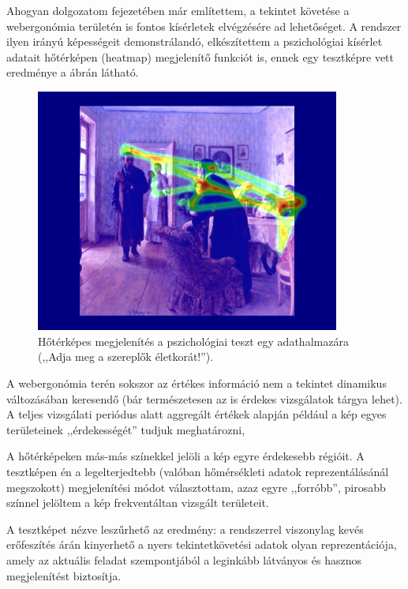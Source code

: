 Ahogyan dolgozatom  fejezetében már említettem, a tekintet követése a webergonómia területén is fontos kísérletek elvégzésére ad lehetőséget. A rendszer ilyen irányú képességeit demonstrálandó, elkészítettem a pszichológiai kísérlet adatait hőtérképen (heatmap) megjelenítő funkciót is, ennek egy tesztképre vett eredménye a  ábrán látható.

\begin{figure}[!ht]
\centering
\includegraphics[width=100mm, keepaspectratio]{figures/heatmap.jpg}
\caption{Hőtérképes megjelenítés a pszichológiai teszt egy adathalmazára (,,Adja meg a szereplők életkorát!'').}
\label{fig:heatmap}
\end{figure}

A webergonómia terén sokszor az értékes információ nem a tekintet dinamikus változásában keresendő (bár természetesen az is érdekes vizsgálatok tárgya lehet). A teljes vizsgálati periódus alatt aggregált értékek alapján például a kép egyes területeinek ,,érdekességét'' tudjuk meghatározni, 

A hőtérképeken más-más színekkel jelöli a kép egyre érdekesebb régióit. A tesztképen én a legelterjedtebb (valóban hőmérsékleti adatok reprezentálásánál megszokott) megjelenítési módot választottam, azaz egyre ,,forróbb'', pirosabb színnel jelöltem a kép frekventáltan vizsgált területeit.

\bigskip

A tesztképet nézve leszűrhető az eredmény: a rendszerrel viszonylag kevés erőfeszítés árán kinyerhető a nyers tekintetkövetési adatok olyan reprezentációja, amely az aktuális feladat szempontjából a leginkább látványos és hasznos megjelenítést biztosítja.

